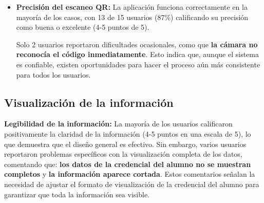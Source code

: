\begin{itemize}
	\item \textbf{Precisión del escaneo QR:} 
	La aplicación funciona correctamente en la mayoría de los casos, con 13 de 15 usuarios (87\%) calificando su precisión como buena o excelente (4-5 puntos de 5). 
	
	Solo 2 usuarios reportaron dificultades ocasionales, como que \textbf{la cámara no reconocía el código inmediatamente}. Esto indica que, aunque el sistema es confiable, existen oportunidades para hacer el proceso aún más consistente para todos los usuarios.
\end{itemize}

\subsection{Visualización de la información}
\textbf{Legibilidad de la información:} 
La mayoría de los usuarios calificaron positivamente la claridad de la información (4-5 puntos en una escala de 5), lo que demuestra que el diseño general es efectivo.
Sin embargo, varios usuarios reportaron problemas específicos con la visualización completa de los datos, comentando que: \textbf{los datos de la credencial del alumno no se muestran completos} y \textbf{la información aparece cortada}. Estos comentarios señalan la necesidad de ajustar el formato de visualización de la credencial del alumno para garantizar que toda la información sea visible.